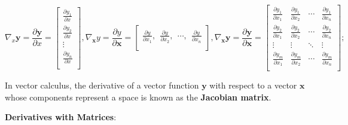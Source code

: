 \documentclass[12pt]{article}
\numberwithin{equation}{section}
\begin{document}
\begin{equation}
	\nabla_{x} \mathbf{y} = \frac{\partial \mathbf{y}}{\partial x} =
	\begin{bmatrix}
		\frac{\partial y_1}{\partial x}\\
		\frac{\partial y_2}{\partial x}\\
		\vdots\\
		\frac{\partial y_n}{\partial x}\\
	\end{bmatrix},
	\nabla_{\mathbf{x}} y = \frac{\partial y}{\partial \mathbf{x}} =
	\begin{bmatrix}
		\frac{\partial y}{\partial x_1},
		\ \ \frac{\partial y}{\partial x_2},
		\ \ \cdots,
		\ \ \frac{\partial y}{\partial x_n}\\
	\end{bmatrix},
	\nabla_{\mathbf{x}} \mathbf{y} = \frac{\partial \mathbf{y}}{\partial \mathbf{x}} =
	\begin{bmatrix}
		\frac{\partial y_1}{\partial x_1} & \frac{\partial y_1}{\partial x_2} & \cdots & \frac{\partial y_1}{\partial x_n}\\
		\frac{\partial y_2}{\partial x_1} & \frac{\partial y_2}{\partial x_2} & \cdots & \frac{\partial y_2}{\partial x_n}\\
		\vdots & \vdots & \ddots & \vdots\\
		\frac{\partial y_m}{\partial x_1} & \frac{\partial y_m}{\partial x_2} & \cdots & \frac{\partial y_m}{\partial x_n}\\
	\end{bmatrix};
\end{equation} \par
In vector calculus, the derivative of a vector function $\mathbf{y}$ with respect to a vector $\mathbf{x}$ whose components represent a space is known as the \textbf{Jacobian matrix}. \par
\textbf{Derivatives with Matrices}:
\end{document}
